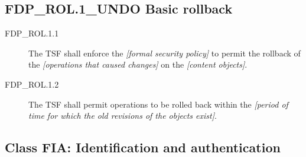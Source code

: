 \documentclass[10pt,a4paper,english]{book}
\begin{document}

\hypertarget{fdp-rol-1-undo-basic-rollback}{}
\subsection{FDP{\_}ROL.1{\_}UNDO Basic rollback}
\begin{description}
\item[FDP{\_}ROL.1.1 ]

The TSF shall enforce the \emph{{[}formal security policy]} to permit
the rollback of the \emph{{[}operations that caused changes]} on the \emph{{[}content
objects]}.

\item[FDP{\_}ROL.1.2 ]

The TSF shall permit operations to be rolled back
within the \emph{{[}period of time for which the old revisions of the objects
exist]}.

\end{description}



\hypertarget{class-fia-identification-and-authentication}{}
\subsection{Class FIA: Identification and authentication}



\hypertarget{fia-afl-z-1-authentication-failure-handling}{}
\end{document}
